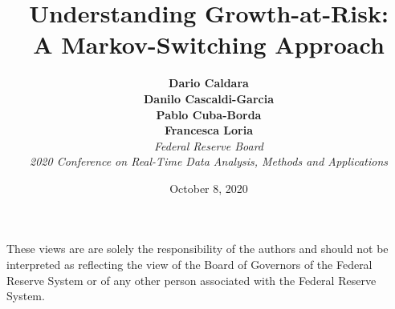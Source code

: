 \documentclass[xcolor=dvipsnames, xcolor=table, 10pt]{beamer}
\begin{document}

\title[Understanding Growth-at-Risk]{\textbf{Understanding Growth-at-Risk:\\ A Markov-Switching Approach}}
\thispagestyle{empty}
\author[Caldara, Cascaldi-Garcia, Cuba-Borda, Loria]{\textbf{Dario Caldara \\ Danilo Cascaldi-Garcia \\ Pablo Cuba-Borda \\ Francesca Loria }\\ \medskip \emph{Federal Reserve Board} \\ \bigskip
\emph{2020 Conference on Real-Time Data Analysis, Methods and Applications}\vspace{-0.5cm}}

\date{October 8, 2020}



\begin{frame}
\titlepage
\vspace{-0.2cm}
\begin{block}{}
	{\scriptsize These views are are solely the responsibility of the authors and should not be interpreted as reflecting the view of the Board of Governors of the Federal Reserve System or of any other person associated with the Federal Reserve System.}
\end{block}
\end{frame}
\end{document}
